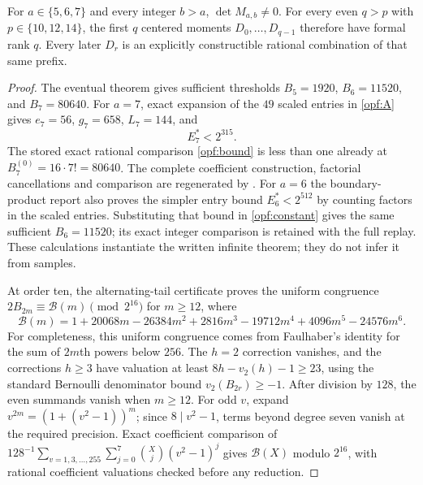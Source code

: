 \begin{theorem}\label{opf:complete}
For $a\in\{5,6,7\}$ and every integer $b>a$, $\det M_{a,b}\ne0$.
For every even $q>p$ with $p\in\{10,12,14\}$, the first $q$
centered moments $D_0,\ldots,D_{q-1}$ therefore have formal rank $q$.
Every later $D_r$ is an explicitly constructible rational combination
of that same prefix.
\end{theorem}

\begin{proof}
The eventual theorem gives sufficient thresholds
$B_5=1920$, $B_6=11520$, and $B_7=80640$.
For $a=7$, exact expansion of the $49$ scaled entries in
\eqref{opf:A} gives $e_7=56$, $g_7=658$, $L_7=144$, and
\[
 E_7^*<2^{315}.
\]
The stored exact rational comparison \eqref{opf:bound} is less than one
already at $B_7^{(0)}=16\cdot7!=80640$. The complete coefficient
construction, factorial cancellations and comparison are regenerated
by .
For $a=6$ the boundary-product report also proves the simpler
entry bound $E_6^*<2^{512}$ by counting factors in the scaled entries.
Substituting that bound in \eqref{opf:constant} gives the same
sufficient $B_6=11520$; its exact integer comparison is retained
with the full replay. These calculations instantiate the written
infinite theorem; they do not infer it from samples.

At order ten, the alternating-tail certificate proves the uniform
congruence $2B_{2m}\equiv\mathcal B(m)\pmod{2^{16}}$ for $m\ge12$,
where
\[
 \mathcal B(m)=1+20068m-26384m^2+2816m^3-19712m^4
                                      +4096m^5-24576m^6.
\]
For completeness, this uniform congruence comes from Faulhaber's
identity for the sum of $2m$th powers below $256$. The $h=2$
correction vanishes, and the corrections $h\ge3$ have valuation
at least $8h-v_2(h)-1\ge23$, using the standard Bernoulli
denominator bound $v_2(B_{2r})\ge-1$.
After division by $128$, the even summands vanish when $m\ge12$.
For odd $v$, expand $v^{2m}=(1+(v^2-1))^m$; since $8\mid v^2-1$,
terms beyond degree seven vanish at the required precision.
Exact coefficient comparison of
$128^{-1}\sum_{v=1,3,\ldots,255}\sum_{j=0}^7
\binom{X}{j}(v^2-1)^j$ gives $\mathcal B(X)$ modulo $2^{16}$,
with rational coefficient valuations checked before any reduction.


\end{proof}
